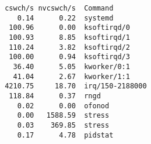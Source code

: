 \begin{frame}[containsverbatim]
\begin{verbatim}
 cswch/s nvcswch/s  Command
    0.14      0.22  systemd
  100.96      0.00  ksoftirqd/0
  100.93      8.85  ksoftirqd/1
  110.24      3.82  ksoftirqd/2
  100.00      0.94  ksoftirqd/3
   36.40      5.05  kworker/0:1
   41.04      2.67  kworker/1:1
 4210.75     18.70  irq/150-2188000
  118.84      0.37  rngd
    0.02      0.00  ofonod
    0.00   1588.59  stress
    0.03    369.85  stress
    0.17      4.78  pidstat
\end{verbatim}
\end{frame}
\begin{frame}
\end{frame}
